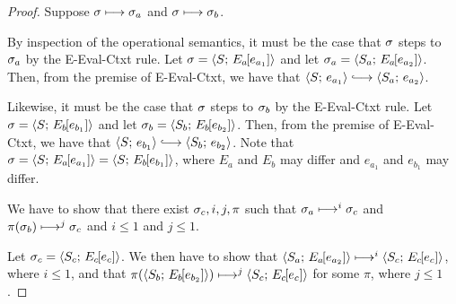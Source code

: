\begin{proof}
  Suppose $\sigma \longmapsto \sigma_a$ and $\sigma \longmapsto \sigma_b$.

  By inspection of the operational semantics, it must be the case that
  $\sigma$ steps to $\sigma_a$ by the {\sc E-Eval-Ctxt} rule.  Let
  $\sigma = \langle S;\, E_a\hspace{-1mm}\left[e_{a_1}\right] \rangle$ and let $\sigma_a =
  \langle S_a;\, E_a\hspace{-1mm}\left[e_{a_2}\right] \rangle$.  Then, from the premise of
         {\sc E-Eval-Ctxt}, we have that $\config{S}{e_{a_1}}
         \parstepsto \config{S_a}{e_{a_2}}$.

  Likewise, it must be the case that $\sigma$ steps to $\sigma_b$ by the
  {\sc E-Eval-Ctxt} rule.  Let $\sigma =
  \langle S;\, E_b\hspace{-1mm}\left[e_{b_1}\right] \rangle$ and let $\sigma_b =
  \langle S_b;\, E_b\hspace{-1mm}\left[e_{b_2}\right] \rangle$.  
  Then, from the premise of {\sc E-Eval-Ctxt}, we have that
  $\config{S}{e_{b_1}} \parstepsto \config{S_b}{e_{b_2}}$.  Note that
  $\sigma = \langle S;\, E_a\hspace{-1mm}\left[e_{a_1}\right] \rangle =
  \langle S;\, E_b\hspace{-1mm}\left[e_{b_1}\right] \rangle$, where $E_a$ and $E_b$ may
  differ and $e_{a_1}$ and $e_{b_1}$ may differ.

  We have to show that there exist $\sigma_c, i, j, \pi$ such that
  $\sigma_a \longmapsto^i \sigma_c$ and $\pi(\sigma_b) \longmapsto^j
  \sigma_c$ and $i \leq 1$ and $j \leq 1$.

  Let $\sigma_c = \langle S_c;\, E_c\hspace{-1mm}\left[e_c\right] \rangle$.  We then have to
  show that $\langle S_a;\, E_a\hspace{-1mm}\left[e_{a_2}\right] \rangle \longmapsto^i
  \langle S_c;\, E_c\hspace{-1mm}\left[e_c\right] \rangle$, where $i \leq 1$, and that
  $\pi(\langle S_b;\, E_b\hspace{-1mm}\left[e_{b_2}\right] \rangle) \longmapsto^j
  \langle S_c;\, E_c\hspace{-1mm}\left[e_c\right] \rangle$ for some $\pi$, where $j \leq 1$.




\end{proof}
